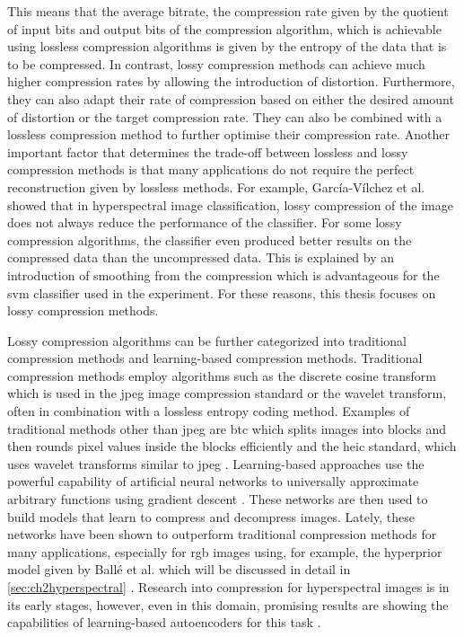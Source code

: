 This means that the average bitrate, the compression rate given by the quotient of input bits and output bits of the compression algorithm, which is achievable using lossless compression algorithms is given by the entropy of the data that is to be compressed.
In contrast, lossy compression methods can achieve much higher compression rates by allowing the introduction of distortion. Furthermore, they can also adapt their rate of compression based on either the desired amount of distortion or the target compression rate. They can also be combined with a lossless compression method to further optimise their compression rate. 
Another important factor that determines the trade-off between lossless and lossy compression methods is that many applications do not require the perfect reconstruction given by lossless methods. For example, García-Vílchez et al. \citep{garcia-vilchez_impact_2011} showed that in hyperspectral image classification, lossy compression of the image does not always reduce the performance of the classifier. For some lossy compression algorithms, the classifier even produced better results on the compressed data than the uncompressed data. This is explained by an introduction of smoothing from the compression which is advantageous for the \ac{svm} classifier used in the experiment. 
For these reasons, this thesis focuses on lossy compression methods.

Lossy compression algorithms can be further categorized into traditional compression methods and learning-based compression methods. Traditional compression methods employ algorithms such as the discrete cosine transform which is used in the \ac{jpeg} image compression standard or the wavelet transform, often in combination with a lossless entropy coding method. Examples of traditional methods other than \ac{jpeg} are \ac{btc} which splits images into blocks and then rounds pixel values inside the blocks efficiently and the \ac{heic} standard, which uses wavelet transforms similar to \ac{jpeg} \citep{delp_image_1979,hannuksela_high_2015}. Learning-based approaches use the powerful capability of artificial neural networks to universally approximate arbitrary functions using gradient descent \citep{ruder_overview_2017}. These networks are then used to build models that learn to compress and decompress images. Lately, these networks have been shown to outperform traditional compression methods for many applications, especially for \ac{rgb} images using, for example, the hyperprior model given by Ballé et al. which will be discussed in detail in \autoref{sec:ch2hyperspectral} \citep{balle_end--end_2017,balle_variational_2018,minnen_joint_2018}. 
Research into compression for hyperspectral images is in its early stages, however, even in this domain, promising results are showing the capabilities of learning-based autoencoders for this task \citep{kuester_1d-convolutional_2021,kuester_transferability_2022,la_grassa_hyperspectral_2022,guo_learned_2021}.


